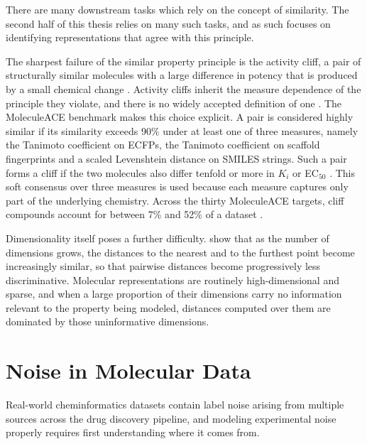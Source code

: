 There are many downstream tasks which rely on the concept of similarity. The second half of this thesis relies on many such tasks, and as such focuses on identifying representations that agree with this principle. 


The sharpest failure of the similar property principle is the activity cliff, a pair of structurally similar molecules with a large difference in potency that is produced by a small
chemical change \citep{Maggiora2006, Stumpfe2012}. Activity cliffs inherit the measure dependence of the principle they violate, and there is no widely accepted definition of one
\citep{vanTilborg2022}. The MoleculeACE benchmark \citep{vanTilborg2022} makes this choice explicit. A pair is considered highly similar if its similarity exceeds 90\% under at least one of
three measures, namely the Tanimoto coefficient on ECFPs, the Tanimoto coefficient on scaffold fingerprints and a scaled Levenshtein distance on SMILES strings. Such a pair forms a cliff if
the two molecules also differ tenfold or more in $K_i$ or EC$_{50}$ \citep{vanTilborg2022}. This soft consensus over three measures is used because each measure captures only part of the
underlying chemistry. Across the thirty MoleculeACE targets, cliff compounds account for between 7\% and 52\% of a dataset \citep{vanTilborg2022}.

Dimensionality itself poses a further difficulty. \citet{Aggarwal2001} show that as the number of dimensions grows, the distances to the nearest and to the furthest
point become increasingly similar, so that pairwise distances become progressively less discriminative. Molecular representations are routinely high-dimensional and sparse, and when a
large proportion of their dimensions carry no information relevant to the property being modeled, distances computed over them are dominated by those uninformative dimensions.



\section{Noise in Molecular Data}

Real-world cheminformatics datasets contain label noise arising from multiple sources across the drug discovery pipeline, and modeling experimental noise properly requires first understanding where it comes from.

